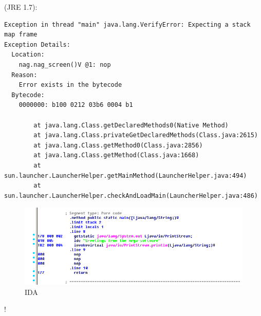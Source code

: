  (JRE 1.7):

\begin{lstlisting}
Exception in thread "main" java.lang.VerifyError: Expecting a stack map frame
Exception Details:
  Location:
    nag.nag_screen()V @1: nop
  Reason:
    Error exists in the bytecode
  Bytecode:
    0000000: b100 0212 03b6 0004 b1

        at java.lang.Class.getDeclaredMethods0(Native Method)
        at java.lang.Class.privateGetDeclaredMethods(Class.java:2615)
        at java.lang.Class.getMethod0(Class.java:2856)
        at java.lang.Class.getMethod(Class.java:1668)
        at sun.launcher.LauncherHelper.getMainMethod(LauncherHelper.java:494)
        at sun.launcher.LauncherHelper.checkAndLoadMain(LauncherHelper.java:486)
\end{lstlisting}

%


\begin{figure}[H]
\centering
\includegraphics[scale=\FigScale]{Java_and_NET/java/13_patching/1/3.png}
\caption{IDA}
\end{figure}


!
